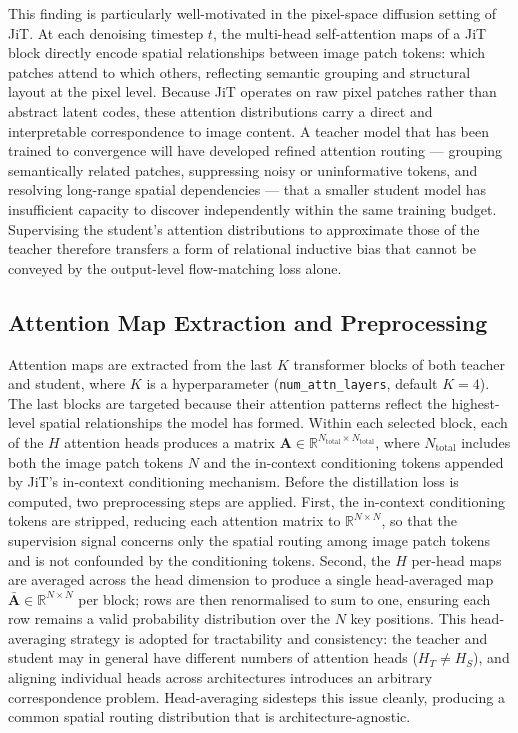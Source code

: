 This finding is particularly well-motivated in the pixel-space diffusion setting of JiT. At each denoising timestep $t$, the multi-head self-attention maps of a JiT block directly encode spatial relationships between image patch tokens: which patches attend to which others, reflecting semantic grouping and structural layout at the pixel level. Because JiT operates on raw pixel patches rather than abstract latent codes, these attention distributions carry a direct and interpretable correspondence to image content. A teacher model that has been trained to convergence will have developed refined attention routing — grouping semantically related patches, suppressing noisy or uninformative tokens, and resolving long-range spatial dependencies — that a smaller student model has insufficient capacity to discover independently within the same training budget. Supervising the student's attention distributions to approximate those of the teacher therefore transfers a form of relational inductive bias that cannot be conveyed by the output-level flow-matching loss alone.

\subsection*{Attention Map Extraction and Preprocessing}

Attention maps are extracted from the last $K$ transformer blocks of both teacher and student, where $K$ is a hyperparameter (\texttt{num\_attn\_layers}, default $K = 4$). The last blocks are targeted because their attention patterns reflect the highest-level spatial relationships the model has formed. Within each selected block, each of the $H$ attention heads produces a matrix $\mathbf{A} \in \mathbb{R}^{N_{\text{total}} \times N_{\text{total}}}$, where $N_{\text{total}}$ includes both the image patch tokens $N$ and the in-context conditioning tokens appended by JiT's in-context conditioning mechanism. Before the distillation loss is computed, two preprocessing steps are applied. First, the in-context conditioning tokens are stripped, reducing each attention matrix to $\mathbb{R}^{N \times N}$, so that the supervision signal concerns only the spatial routing among image patch tokens and is not confounded by the conditioning tokens. Second, the $H$ per-head maps are averaged across the head dimension to produce a single head-averaged map $\bar{\mathbf{A}} \in \mathbb{R}^{N \times N}$ per block; rows are then renormalised to sum to one, ensuring each row remains a valid probability distribution over the $N$ key positions. This head-averaging strategy is adopted for tractability and consistency: the teacher and student may in general have different numbers of attention heads ($H_T \neq H_S$), and aligning individual heads across architectures introduces an arbitrary correspondence problem. Head-averaging sidesteps this issue cleanly, producing a common spatial routing distribution that is architecture-agnostic.

